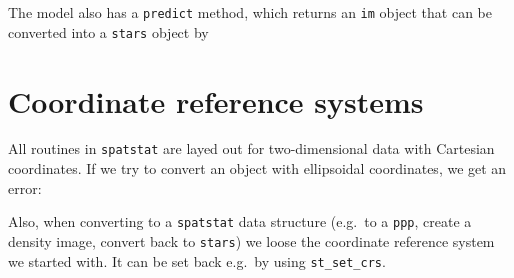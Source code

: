 \documentclass[]{book}
\newenvironment{Shaded}{\begin{snugshade}}{\end{snugshade}}
\newcommand{\CommentTok}[1]{\textcolor[rgb]{0.56,0.35,0.01}{\textit{#1}}}
\newcommand{\DataTypeTok}[1]{\textcolor[rgb]{0.13,0.29,0.53}{#1}}
\newcommand{\KeywordTok}[1]{\textcolor[rgb]{0.13,0.29,0.53}{\textbf{#1}}}
\newcommand{\NormalTok}[1]{#1}
\newcommand{\OperatorTok}[1]{\textcolor[rgb]{0.81,0.36,0.00}{\textbf{#1}}}
\newcommand{\StringTok}[1]{\textcolor[rgb]{0.31,0.60,0.02}{#1}}
\begin{document}
The model also has a \texttt{predict} method, which returns an \texttt{im} object that
can be converted into a \texttt{stars} object by

\begin{Shaded}
\end{Shaded}

\hypertarget{coordinate-reference-systems-1}{%
\section{Coordinate reference systems}\label{coordinate-reference-systems-1}}

All routines in \texttt{spatstat} are layed out for two-dimensional data with
Cartesian coordinates. If we try to convert an object with ellipsoidal
coordinates, we get an error:

\begin{Shaded}
\end{Shaded}

Also, when converting to a \texttt{spatstat} data structure (e.g.~to a
\texttt{ppp}, create a density image, convert back to \texttt{stars}) we loose
the coordinate reference system we started with. It can be set
back e.g.~by using \texttt{st\_set\_crs}.
\end{document}
